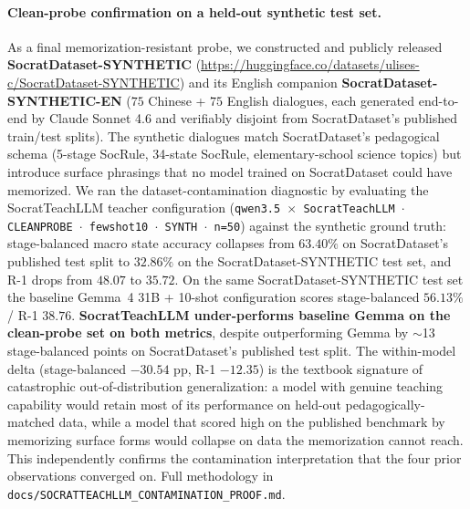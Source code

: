 \documentclass[11pt]{article}
\begin{document}
\paragraph{Clean-probe confirmation on a held-out synthetic test set.} As a final memorization-resistant probe, we constructed and publicly released \textbf{SocratDataset-SYNTHETIC} (\url{https://huggingface.co/datasets/ulises-c/SocratDataset-SYNTHETIC}) and its English companion \textbf{SocratDataset-SYNTHETIC-EN} ($75$ Chinese + $75$ English dialogues, each generated end-to-end by Claude Sonnet 4.6 and verifiably disjoint from SocratDataset's published train/test splits). The synthetic dialogues match SocratDataset's pedagogical schema (5-stage SocRule, 34-state SocRule, elementary-school science topics) but introduce surface phrasings that no model trained on SocratDataset could have memorized. We ran the dataset-contamination diagnostic by evaluating the SocratTeachLLM teacher configuration (\texttt{qwen3.5 $\times$ SocratTeachLLM $\cdot$ CLEANPROBE $\cdot$ fewshot10 $\cdot$ SYNTH $\cdot$ n=50}) against the synthetic ground truth: stage-balanced macro state accuracy collapses from $\mathbf{63.40\%}$ on SocratDataset's published test split to $\mathbf{32.86\%}$ on the SocratDataset-SYNTHETIC test set, and R-1 drops from $48.07$ to $35.72$. On the same SocratDataset-SYNTHETIC test set the baseline Gemma~4 31B + 10-shot configuration scores stage-balanced $56.13\%$ / R-1 $38.76$. \textbf{SocratTeachLLM under-performs baseline Gemma on the clean-probe set on both metrics}, despite outperforming Gemma by $\sim$13 stage-balanced points on SocratDataset's published test split. The within-model delta (stage-balanced $-30.54$ pp, R-1 $-12.35$) is the textbook signature of catastrophic out-of-distribution generalization: a model with genuine teaching capability would retain most of its performance on held-out pedagogically-matched data, while a model that scored high on the published benchmark by memorizing surface forms would collapse on data the memorization cannot reach. This independently confirms the contamination interpretation that the four prior observations converged on. Full methodology in \texttt{docs/SOCRATTEACHLLM\_CONTAMINATION\_PROOF.md}.
\end{document}
